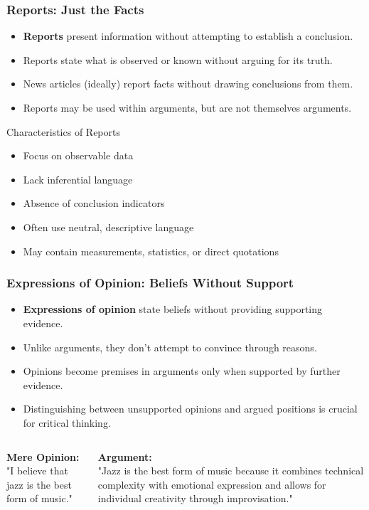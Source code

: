 \documentclass{beamer}
\begin{document}
\begin{frame}
    \frametitle{Reports: Just the Facts}
    \begin{itemize}
        \item \textbf{Reports} present information without attempting to establish a conclusion.
        \item Reports state what is observed or known without arguing for its truth.
        \item News articles (ideally) report facts without drawing conclusions from them.
        \item Reports may be used within arguments, but are not themselves arguments.
    \end{itemize}
    
    \begin{block}{Characteristics of Reports}
        \begin{itemize}
            \item Focus on observable data
            \item Lack inferential language
            \item Absence of conclusion indicators
            \item Often use neutral, descriptive language
            \item May contain measurements, statistics, or direct quotations
        \end{itemize}
    \end{block}
\end{frame}

\begin{frame}
    \frametitle{Expressions of Opinion: Beliefs Without Support}
    \begin{itemize}
        \item \textbf{Expressions of opinion} state beliefs without providing supporting evidence.
        \item Unlike arguments, they don't attempt to convince through reasons.
        \item Opinions become premises in arguments only when supported by further evidence.
        \item Distinguishing between unsupported opinions and argued positions is crucial for critical thinking.
    \end{itemize}
    
    \begin{columns}[t]
        \textbf{Mere Opinion:}\\
        "I believe that jazz is the best form of music."
        
        \textbf{Argument:}\\
        "Jazz is the best form of music because it combines technical complexity with emotional expression and allows for individual creativity through improvisation."
    \end{columns}
\end{frame}
\end{document}

